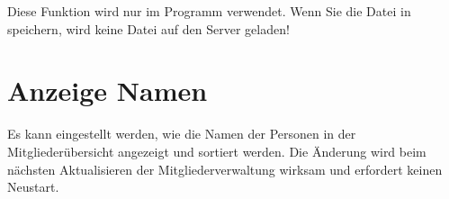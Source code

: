 \begin{hinweis}
  Diese Funktion wird nur im Programm \Einsatz verwendet.
  Wenn Sie die Datei in \Personal speichern,
  wird keine Datei auf den Server geladen!
\end{hinweis}


\section{Anzeige Namen}
Es kann eingestellt werden, wie die Namen der Personen in der Mitgliederübersicht angezeigt und sortiert werden.
Die Änderung wird beim nächsten Aktualisieren der Mitgliederverwaltung wirksam und erfordert keinen Neustart.
